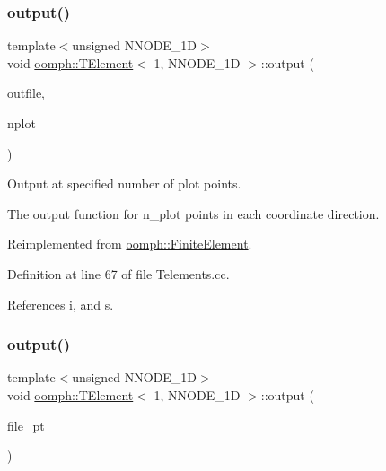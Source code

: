 \subsubsection{\texorpdfstring{output()}{output()}\hspace{0.1cm}{\footnotesize\ttfamily [2/4]}}
{\footnotesize\ttfamily template$<$unsigned N\+N\+O\+D\+E\+\_\+1D$>$ \\
void \hyperlink{classoomph_1_1TElement}{oomph\+::\+T\+Element}$<$ 1, N\+N\+O\+D\+E\+\_\+1D $>$\+::output (\begin{DoxyParamCaption}\item[{std\+::ostream \&}]{outfile,  }\item[{const unsigned \&}]{nplot }\end{DoxyParamCaption})\hspace{0.3cm}{\ttfamily [virtual]}}



Output at specified number of plot points. 

The output function for n\+\_\+plot points in each coordinate direction. 

Reimplemented from \hyperlink{classoomph_1_1FiniteElement_afa9d9b2670f999b43e6679c9dd28c457}{oomph\+::\+Finite\+Element}.



Definition at line 67 of file Telements.\+cc.



References i, and s.

\mbox{\label{classoomph_1_1TElement_3_011_00_01NNODE__1D_01_4_a18c5b00c61bc0a612684f763c834618d}} 
\subsubsection{\texorpdfstring{output()}{output()}\hspace{0.1cm}{\footnotesize\ttfamily [3/4]}}
{\footnotesize\ttfamily template$<$unsigned N\+N\+O\+D\+E\+\_\+1D$>$ \\
void \hyperlink{classoomph_1_1TElement}{oomph\+::\+T\+Element}$<$ 1, N\+N\+O\+D\+E\+\_\+1D $>$\+::output (\begin{DoxyParamCaption}\item[{F\+I\+LE $\ast$}]{file\+\_\+pt }\end{DoxyParamCaption})\hspace{0.3cm}{\ttfamily [virtual]}}



